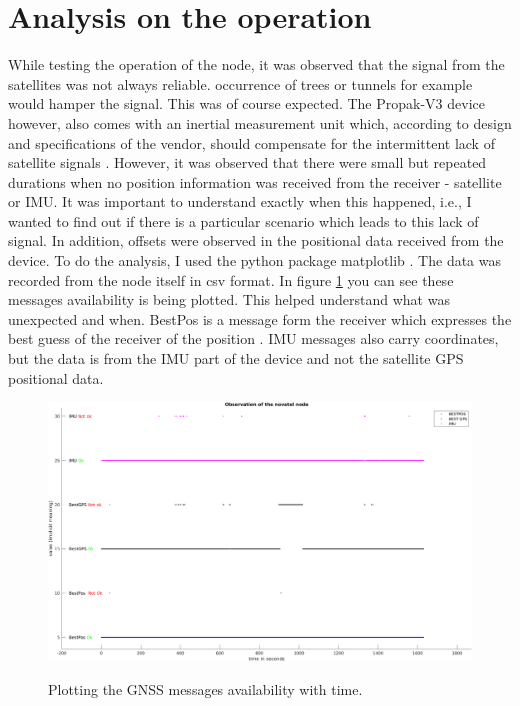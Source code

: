 \documentclass[a4paper, 12pt, oneside]{report}
\begin{document}
  \section{Analysis on the operation}
  
  While testing the operation of the node, it was observed that the signal from the satellites was not always reliable. occurrence of trees or tunnels for example would hamper the signal. This was of course expected. The Propak-V3 device however, also comes with an inertial measurement unit \cite{InertialmeasurementunitWikipedia-2020-02-02} which, according to design and specifications of the vendor, should compensate for the intermittent lack of satellite signals \cite{-2014-10-09}. However, it was observed that there were small but repeated durations when no position information was received from the receiver - satellite or IMU. It was important to understand exactly when this happened, i.e., I wanted to find out if there is a particular scenario which leads to this lack of signal. In addition, offsets were observed in the positional data received from the device. To do the analysis, I used the python package matplotlib \cite{MatplotlibPythonplottingMatplotlib313documentation-2020-02-09}. The data was recorded from the node itself in csv format. In figure \ref{fig:gnssavailability} you can see these messages availability is being plotted. This helped understand what was unexpected and when. BestPos is a message form the receiver which expresses the best guess of the receiver of the position \cite{-2014-10-09}. IMU messages also carry coordinates, but the data is from the IMU part of the device and not the satellite GPS positional data.
    
  \begin{figure}[h]
      \caption{Plotting the GNSS messages availability with time.}
      \centering
      \includegraphics[width=1\textwidth]{TestDrive6_Visualized}
      \label{fig:gnssavailability}
  \end{figure}
\end{document}
